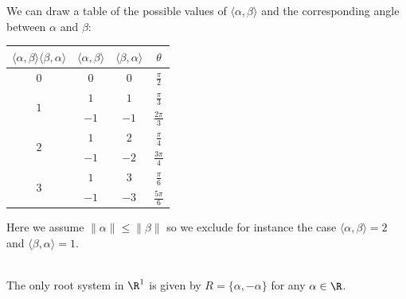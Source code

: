 \documentclass[a4paper]{article}
\begin{document}
We can draw a table of the possible values of $\langle\alpha,\beta\rangle$ and the corresponding angle between $\alpha$ and $\beta$: 

\begin{table}[!h]
\centering
\begin{tabular}{|c|c|c|c|}
\hline
$\langle\alpha,\beta\rangle\langle\beta,\alpha\rangle$ & $\langle\alpha,\beta\rangle$ & $\langle\beta,\alpha\rangle$ & $\theta$         \\ \hline
$0$                                                    & $0$                          & $0$                          & $\frac{\pi}{2}$  \\[1.5ex] \hline
\multirow{2}{*}{$1$}                                   & $1$                          & $1$                          & $\frac{\pi}{3}$  \\[1.5ex] \cline{2-4} 
                                                       & $-1$                         & $-1$                         & $\frac{2\pi}{3}$ \\[1.5ex] \hline
\multirow{2}{*}{$2$}                                   & $1$                          & $2$                          & $\frac{\pi}{4}$  \\[1.5ex] \cline{2-4} 
                                                       & $-1$                         & $-2$                         & $\frac{3\pi}{4}$ \\[1.5ex] \hline
\multirow{2}{*}{$3$}                                   & $1$                          & $3$                          & $\frac{\pi}{6}$  \\[1.5ex] \cline{2-4} 
                                                       & $-1$                         & $-3$                         & $\frac{5\pi}{6}$ \\[1.5ex] \hline
\end{tabular}
\end{table}

Here we assume $\|\alpha\|\leq\|\beta\|$ so we exclude for instance the case $\langle\alpha,\beta\rangle=2$ and $\langle\beta,\alpha\rangle=1$. 

\begin{eg}{}{} \\The only root system in $\R^1$ is given by $R=\{\alpha,-\alpha\}$ for any $\alpha\in\R$. 
\end{eg}
\end{document}
